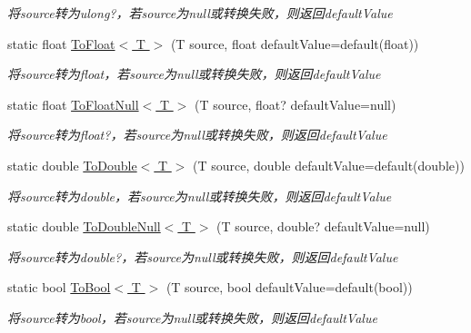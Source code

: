 \begin{DoxyCompactItemize}
\begin{DoxyCompactList}\small\item\em 将source转为ulong?，若source为null或转换失败，则返回default\+Value \end{DoxyCompactList}\item 
static float \hyperlink{class_x_c_l_net_tools_1_1_common_1_1_data_type_convert_a5b731d77475825f8076062700300fb1d}{To\+Float$<$ T $>$} (T source, float default\+Value=default(float))
\begin{DoxyCompactList}\small\item\em 将source转为float，若source为null或转换失败，则返回default\+Value \end{DoxyCompactList}\item 
static float \hyperlink{class_x_c_l_net_tools_1_1_common_1_1_data_type_convert_a920d5e3af3b7c6b95ee7d66e57722df8}{To\+Float\+Null$<$ T $>$} (T source, float? default\+Value=null)
\begin{DoxyCompactList}\small\item\em 将source转为float?，若source为null或转换失败，则返回default\+Value \end{DoxyCompactList}\item 
static double \hyperlink{class_x_c_l_net_tools_1_1_common_1_1_data_type_convert_a331227ffa8db1d71402b3154da934f9c}{To\+Double$<$ T $>$} (T source, double default\+Value=default(double))
\begin{DoxyCompactList}\small\item\em 将source转为double，若source为null或转换失败，则返回default\+Value \end{DoxyCompactList}\item 
static double \hyperlink{class_x_c_l_net_tools_1_1_common_1_1_data_type_convert_a2b29891bcccd29fba9afffcf8f77290a}{To\+Double\+Null$<$ T $>$} (T source, double? default\+Value=null)
\begin{DoxyCompactList}\small\item\em 将source转为double?，若source为null或转换失败，则返回default\+Value \end{DoxyCompactList}\item 
static bool \hyperlink{class_x_c_l_net_tools_1_1_common_1_1_data_type_convert_a4368d6697502ec519f8fc5c8c3a4cc03}{To\+Bool$<$ T $>$} (T source, bool default\+Value=default(bool))
\begin{DoxyCompactList}\small\item\em 将source转为bool，若source为null或转换失败，则返回default\+Value \end{DoxyCompactList}\item 

\end{DoxyCompactItemize}
